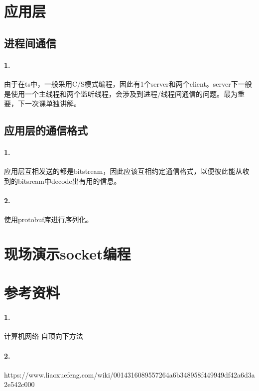 \documentclass[12pt]{article}
\begin{document}
\begin{CJK}{UTF8}{gbsn}
\section{应用层}
\subsection{进程间通信}
\paragraph{1.}由于在ts中，一般采用C/S模式编程，因此有1个server和两个client。server下一般是使用一个主线程和两个监听线程，会涉及到进程/线程间通信的问题。最为重要，下一次课单独讲解。
\subsection{应用层的通信格式}
\paragraph{1.}应用层互相发送的都是bitstream，因此应该互相约定通信格式，以便彼此能从收到的bitsream中decode出有用的信息。
\paragraph{2.}使用protobuf库进行序列化。

\section{现场演示socket编程}

\section{参考资料}
\paragraph{1.}计算机网络 自顶向下方法
\paragraph{2.}https://www.liaoxuefeng.com/wiki/0014316089557264a6b348958f449949df42a6d3a2e542c000




\end{CJK}
\end{document}
